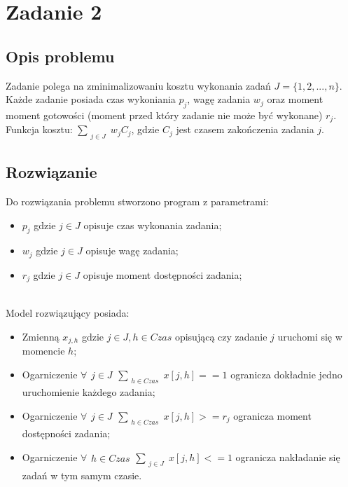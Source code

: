 \chapter{Zadanie 2}
\thispagestyle{chapterBeginStyle}
\label{rozdzial2}

\section{Opis problemu}
Zadanie polega na zminimalizowaniu kosztu wykonania zadań $J = \{1,2,...,n\}$.
Każde zadanie posiada czas wykoniania $p_{j}$, wagę zadania $w_{j}$ 
oraz moment moment gotowości (moment przed który zadanie nie może być wykonane) $r_j$.
Funkcja kosztu: 
$\sum_{\substack{j \in J}} w_j C_j$,
gdzie $C_j$ jest czasem zakończenia zadania $j$. 

\section{Rozwiązanie}
Do rozwiązania problemu stworzono program z parametrami: 
\begin{itemize}
    \item $p_{j}$ gdzie $j \in J$ opisuje czas wykonania zadania;
    \item $w_{j}$ gdzie $j \in J$ opisuje wagę zadania;
    \item $r_{j}$ gdzie $j \in J$ opisuje moment dostępności zadania;
\end{itemize}
\   \\
Model rozwiązujący posiada:
\begin{itemize}
    \item Zmienną $x_{j,h}$ gdzie $j \in J, h \in Czas$ opisującą czy zadanie $j$ uruchomi się w momencie $h$;
    \item Ogarniczenie $\forall \substack{j \in J} \sum_{\substack{h \in Czas}} x[j,h] == 1$ ogranicza dokładnie jedno uruchomienie każdego zadania;
    \item Ogarniczenie $\forall \substack{j \in J} \sum_{\substack{h \in Czas}} x[j,h] >= r_j$ ogranicza moment dostępności zadania;
    \item Ogarniczenie $\forall \substack{h \in Czas} \sum_{\substack{j \in J}} x[j,h] <= 1$ ogranicza nakładanie się zadań w tym samym czasie.
\end{itemize}

